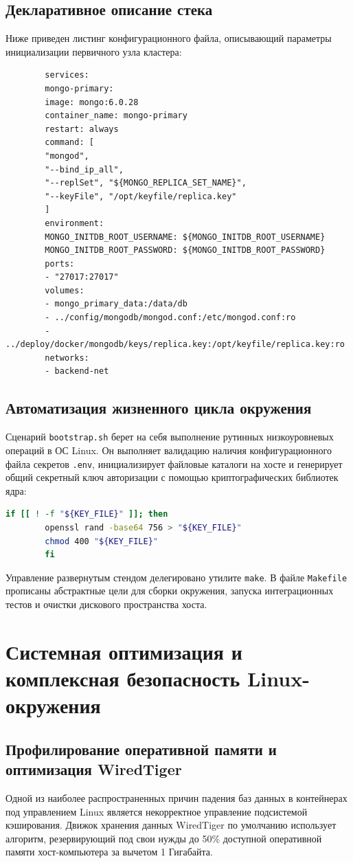 \documentclass[a4paper,14pt]{extarticle}
\begin{document}
	\subsection{Декларативное описание стека}
	Ниже приведен листинг конфигурационного файла, описывающий параметры инициализации первичного узла кластера:
	\begin{lstlisting}
		services:
		mongo-primary:
		image: mongo:6.0.28
		container_name: mongo-primary
		restart: always
		command: [
		"mongod", 
		"--bind_ip_all", 
		"--replSet", "${MONGO_REPLICA_SET_NAME}", 
		"--keyFile", "/opt/keyfile/replica.key"
		]
		environment:
		MONGO_INITDB_ROOT_USERNAME: ${MONGO_INITDB_ROOT_USERNAME}
		MONGO_INITDB_ROOT_PASSWORD: ${MONGO_INITDB_ROOT_PASSWORD}
		ports:
		- "27017:27017"
		volumes:
		- mongo_primary_data:/data/db
		- ../config/mongodb/mongod.conf:/etc/mongod.conf:ro
		- ../deploy/docker/mongodb/keys/replica.key:/opt/keyfile/replica.key:ro
		networks:
		- backend-net
	\end{lstlisting}
	
	\subsection{Автоматизация жизненного цикла окружения}
	Сценарий \texttt{bootstrap.sh} берет на себя выполнение рутинных низкоуровневых операций в ОС Linux. Он выполняет валидацию наличия конфигурационного файла секретов \texttt{.env}, инициализирует файловые каталоги на хосте и генерирует общий секретный ключ авторизации с помощью криптографических библиотек ядра:
	\begin{lstlisting}[language=bash]
		if [[ ! -f "${KEY_FILE}" ]]; then
		openssl rand -base64 756 > "${KEY_FILE}"
		chmod 400 "${KEY_FILE}"
		fi
	\end{lstlisting}
	Управление развернутым стендом делегировано утилите \texttt{make}. В файле \texttt{Makefile} прописаны абстрактные цели для сборки окружения, запуска интеграционных тестов и очистки дискового пространства хоста.
	
	\newpage
	
	\section{Системная оптимизация и комплексная безопасность Linux-окружения}
	
	\subsection{Профилирование оперативной памяти и оптимизация WiredTiger}
	Одной из наиболее распространенных причин падения баз данных в контейнерах под управлением Linux является некорректное управление подсистемой кэширования. Движок хранения данных WiredTiger по умолчанию использует алгоритм, резервирующий под свои нужды до 50\% доступной оперативной памяти хост-компьютера за вычетом 1 Гигабайта. 
	
\end{document}
